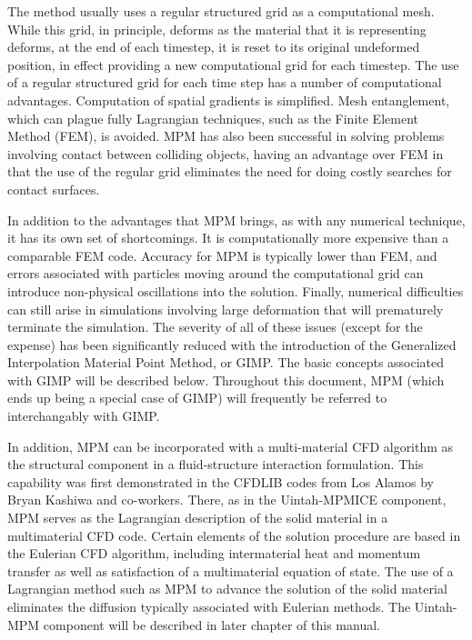 The method usually uses a regular structured grid as a computational mesh.
While this grid, in principle, deforms as the material that it is representing
deforms, at the end of each timestep, it is reset to its original undeformed
position, in effect providing a new computational grid for each timestep.
The use of a regular structured grid for each time step has a number of
computational advantages.  Computation of spatial gradients is simplified.
Mesh entanglement, which can plague fully Lagrangian techniques, such as
the Finite Element Method (FEM), is avoided.  MPM has also been successful
in solving problems involving contact between colliding objects, having an
advantage over FEM in that the use of the regular grid eliminates the
need for doing costly searches for contact surfaces\cite{bard}.

In addition to the advantages that MPM brings, as with any numerical technique, it has its own set of shortcomings.  It is computationally more
expensive than a comparable FEM code.  Accuracy for MPM is typically lower
than FEM, and errors associated with particles moving around the computational
grid can introduce non-physical oscillations into the solution.  Finally,
numerical difficulties can still arise in simulations involving large
deformation that will prematurely terminate the simulation.  The severity of
all of these issues (except for the expense) has been significantly reduced
with the introduction of the Generalized Interpolation Material Point Method,
or GIMP\cite{bardgimp}.  The basic concepts associated with GIMP will be
described below.  Throughout this document, MPM (which
ends up being a special case of GIMP) will frequently be referred to
interchangably with GIMP.

In addition, MPM can be incorporated with a multi-material CFD algorithm
as the structural component in a fluid-structure interaction formulation.
This capability was first demonstrated in the CFDLIB codes from
Los Alamos by Bryan Kashiwa and co-workers\cite{kashiwa2000}.  There, as
in the Uintah-MPMICE component,
MPM serves as the Lagrangian description of the solid
material in a multimaterial CFD code.  Certain elements of the
solution procedure are based in the Eulerian CFD algorithm, including
intermaterial heat and momentum transfer as well as satisfaction
of a multimaterial equation of state.  The use of a Lagrangian method
such as MPM to advance the solution of the solid material eliminates
the diffusion typically associated with Eulerian methods.  The Uintah-MPM
component will be described in later chapter of this manual.

